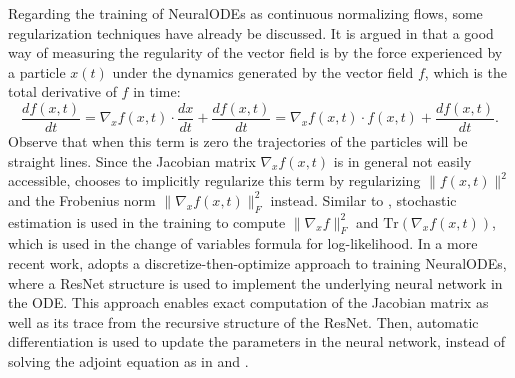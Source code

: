 Regarding the training of NeuralODEs as continuous normalizing flows, some regularization techniques have already be discussed. It is argued in \cite{HowToTrain} that a good way of measuring the regularity of the vector field is by the force experienced by a particle $x(t)$ under the dynamics generated by the vector field $f$, which is the total derivative of $f$ in time: 
\begin{equation}\label{eq:straightlinereg}
\frac{df(x,t)}{dt} = \nabla_x f(x,t) \cdot \frac{dx}{dt} + \frac{df(x,t)}{dt} = \nabla_x f(x,t) \cdot f(x,t) + \frac{df(x,t)}{dt}.
\end{equation}
Observe that when this term is zero the trajectories of the particles will be straight lines. Since the Jacobian matrix $\nabla_x f(x,t)$ is in general not easily accessible, \cite{HowToTrain} chooses to implicitly regularize this term by regularizing $\|f(x,t)\|^2$ and the Frobenius norm $\|\nabla_x f(x,t)\|_F^2$ instead. Similar to \cite{ffjord}, stochastic estimation is used in the training to compute $\|\nabla_x f\|_F^2$ and $\text{Tr}(\nabla_x f(x,t))$, which is used in the change of variables formula for log-likelihood. In a more recent work, \cite{OTFlow} adopts a discretize-then-optimize approach to training NeuralODEs, where a ResNet structure is used to implement the underlying neural network in the ODE. This approach enables exact computation of the Jacobian matrix as well as its trace from the recursive structure of the ResNet. Then, automatic differentiation is used to update the parameters in the neural network, instead of solving the adjoint equation as in \cite{ffjord} and \cite{HowToTrain}. 


